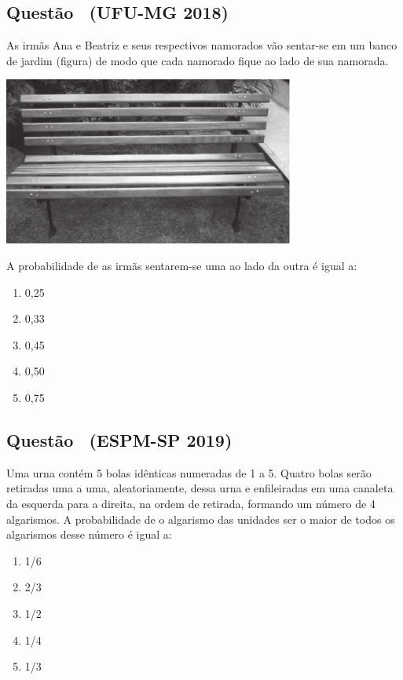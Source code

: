 \documentclass[12pt]{article}
\newcounter{questao}
\newcommand{\novaquestao}[1]{%
  \stepcounter{questao}%
  \subsection*{Questão \thequestao\ (#1)}%
}
\begin{document}
\begin{multicols}{2}
        \novaquestao{UFU-MG 2018}

            As irmãs Ana e Beatriz e seus respectivos namorados vão sentar-se em um banco de 
            jardim (figura) de modo que cada namorado fique ao lado de sua namorada.

            \begin{center}
                \includegraphics[scale=0.6]{imagens/ufu-2018.png}
            \end{center} A probabilidade de as irmãs sentarem-se uma ao lado da outra é igual a:

            \begin{enumerate}[label=(\alph*), noitemsep]
                \item 0,25
                \item 0,33
                \item 0,45
                \item 0,50
                \item 0,75
            \end{enumerate}
        
        \novaquestao{ESPM-SP 2019}

            Uma urna contém 5 bolas idênticas numeradas de 1 a 5. Quatro bolas serão retiradas
            uma a uma, aleatoriamente, dessa urna e enfileiradas em uma canaleta da esquerda 
            para a direita, na ordem de retirada, formando um número de 4 algarismos. A 
            probabilidade de o algarismo das unidades ser o maior de todos os algarismos 
            desse número é igual a:

            \begin{enumerate}[label=(\alph*), noitemsep]
                \item {1}/{6}
                \item {2}/{3}
                \item {1}/{2}
                \item {1}/{4}
                \item {1}/{3}
            \end{enumerate}
        

\end{multicols}
\end{document}
